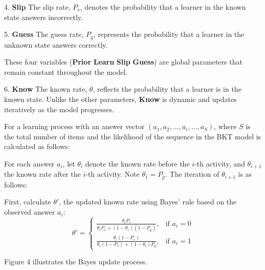 \documentclass{article}
\begin{document}
4. \textbf{Slip}  
The slip rate, \( P_s \), denotes the probability that a learner in the known state answers incorrectly.

5. \textbf{Guess}  
The guess rate, \( P_g \), represents the probability that a learner in the unknown state answers correctly.

These four variables (\textbf{Prior} \textbf{Learn} \textbf{Slip} \textbf{Guess}) are global parameters that remain constant throughout the model.

6. \textbf{Know}  
The known rate, \( \theta \), reflects the probability that a learner is in the known state. Unlike the other parameters, \textbf{Know} is dynamic and updates iteratively as the model progresses.

For a learning process with an answer vector \( (a_1, a_2, \dots, a_i, \dots, a_S) \), where $S$ is the total number of items and the likelihood of the sequence in the BKT model is calculated as follows:

For each answer \( a_i \), let \(\theta_{i}\) denote the known rate before the \(i\)-th activity, and \(\theta_{i+1}\) the known rate after the \(i\)-th activity. Note \(\theta_1 = P_p\). The iteration of \(\theta_{i+1}\) is as follows:

First, calculate \(\theta'\), the updated known rate using Bayes' rule based on the observed answer \( a_i \):
\[
\theta' = 
\begin{cases} 
    \frac{\theta_{i} P_s}{\theta_{i} P_s + (1 - \theta_{i}) (1 - P_g)}, & \text{if } a_i = 0 \\[10pt]
    \frac{\theta_{i} (1 - P_s)}{\theta_{i} (1 - P_s) + (1 - \theta_{i}) P_g}, & \text{if } a_i = 1 
\end{cases}
\]

Figure 4 illustrates the Bayes update process.

\begin{center}
\end{center}
\end{document}

